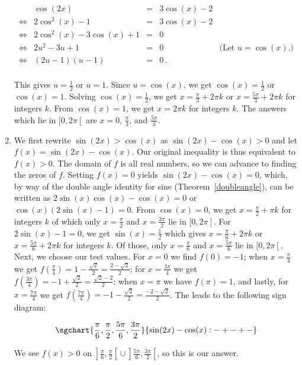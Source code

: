 \begin{example}
\begin{enumerate}
\[ \begin{array}{rrclr}

&\cos(2x) & = & 3\cos(x) - 2 & \\
\Leftrightarrow&2\cos^{2}(x) -1 & = & 3\cos(x) -2 & \\%
\Leftrightarrow&2\cos^{2}(x) - 3\cos(x) +1 & = & 0 & \\
\Leftrightarrow&2 u^2 - 3 u + 1 & = & 0 & \text{(Let $u = \cos(x)$.)}\\
\Leftrightarrow&(2u - 1)(u - 1) & = & 0\,. & \\ \end{array} \]

This gives $u = \frac{1}{2}$ or $u = 1$.  Since $u = \cos(x)$, we get $\cos(x) = \frac{1}{2}$ or $\cos(x) = 1$.  Solving  $\cos(x) = \frac{1}{2}$, we get $x = \frac{\pi}{3} + 2\pi k$ or $x = \frac{5\pi}{3} + 2\pi k$ for integers $k$.  From $\cos(x) = 1$, we get $x = 2\pi k$ for integers $k$.  The answers which lie in $[0,2\pi\left[\right.$ are $x =0$,  $\frac{\pi}{3}$, and $\frac{5\pi}{3}$.  



\item  We first rewrite  $\sin(2x) > \cos(x)$   as $\sin(2x) - \cos(x) > 0$ and let $f(x) = \sin(2x) - \cos(x)$.  Our original inequality is thus equivalent to $f(x) > 0$. The domain of $f$ is all real numbers, so we can advance to finding the zeros of $f$.  Setting $f(x) = 0$ yields $\sin(2x) - \cos(x) = 0$, which, by way of the double angle identity for sine (Theorem~\ref{doubleangle}), can be written as $2\sin(x)\cos(x) - \cos(x) = 0$ or $\cos(x) (2\sin(x) - 1) = 0$. 
From $\cos(x) = 0$, we get $x = \frac{\pi}{2} + \pi k$ for integers $k$ of which only $x = \frac{\pi}{2}$ and $x = \frac{3\pi}{2}$ lie in $[0,2\pi\left[\right.$.  For $2\sin(x) - 1 = 0$, we get $\sin(x) = \frac{1}{2}$ which gives $x = \frac{\pi}{6} + 2\pi k$ or $x = \frac{5\pi}{6} + 2\pi k$ for integers $k$.  Of those, only $x = \frac{\pi}{6}$ and $x = \frac{5\pi}{6}$ lie in $[0,2\pi\left[\right.$.  Next, we choose our test values.  For $x =0$ we find $f(0) = -1$; when $x = \frac{\pi}{4}$ we get $f\left(\frac{\pi}{4}\right) =1 - \frac{\sqrt{2}}{2} = \frac{2 - \sqrt{2}}{2}$;  for $x = \frac{3\pi}{4}$ we get $f\left(\frac{3\pi}{4}\right) =-1 + \frac{\sqrt{2}}{2} =  \frac{\sqrt{2} - 2}{2}$;  when $x=\pi$ we have $f(\pi) = 1$, and lastly, for $x = \frac{7\pi}{4}$ we get $f\left(\frac{7\pi}{4}\right) = -1 - \frac{\sqrt{2}}{2} =  \frac{-2 - \sqrt{2}}{2}$. The leads to the following sign diagram:

$$
\sgchart{\frac{\pi}{6},\frac{\pi}{2},\frac{5\pi}{6},\frac{3\pi}{2}} {\sin(2x) - \cos(x): -+-+-}
$$

 We see $f(x) > 0$ on $\left.\right]\frac{\pi}{6}, \frac{\pi}{2}\left[\right. \cup \left.\right]\frac{5\pi}{6}, \frac{3\pi}{2}\left[\right.$, so this is our answer. 


\end{enumerate}

\end{example}

